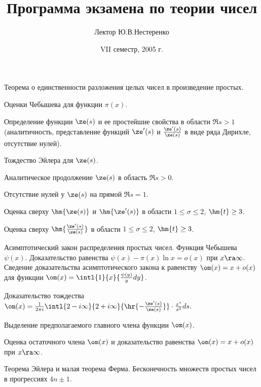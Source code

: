 \documentclass[a4paper]{article}
\title{Программа экзамена по теории чисел}
\author{Лектор Ю.В.Нестеренко}
\date{VII семестр, 2005 г.}
\begin{document}
\maketitle

\begin{nums}{-3.2}

\item  Теорема о единственности разложения целых чисел в произведение простых.

\item  Оценки Чебышева для функции $\pi(x)$.

\item  Определение функции $\ze(s)$
и ее простейшие свойства в области $\Re s > 1$ (аналитичность, представление функций
$\ze'(s)$ и $\frac{\ze '(s)}{\ze(s)}$ в виде ряда Дирихле,
отсутствие нулей).

\item  Тождество Эйлера для $\ze(s)$.

\item  Аналитическое продолжение $\ze(s)$ в область $\Re s > 0$.

\item  Отсутствие нулей у $\ze(s)$ на прямой $\Re s = 1$.

\item  Оценка сверху $\hm{\ze(s)}$ и $\hm{\ze'(s)}$
в области $1\le \sigma \le 2$, $\hm{t} \ge 3$.

\item  Оценка сверху $\hm{\frac{\ze '(s)}{\ze (s)}}$ в области $1 \le \sigma \le 2$,
$\hm{t} \ge 3$.

\item  Асимптотический закон распределения простых чисел. Функция Чебышева~$\psi(x)$.
Доказательство равенства $\psi(x) - \pi(x)\ln x = o(x)$ при $x \ra\infty$.
Сведение доказательства асимптотического закона к равенству
$\om(x) = x + o(x)$ для функции $\om (x) = \intl{1}{x}{\frac{\psi(y)}{y}dy}$.

\item  Доказательство тождества
$
\om (x) = \frac{1}{2\pi i}\intl{2 - i\infty }{2 + i\infty }{\hr{-\frac{\ze '(s)}{\ze (s)}}} \cdot \frac{x^s}{s^2}ds.
$

\item Выделение предполагаемого главного члена функции $\om(x)$.

\item Оценка остаточного члена $\om(x)$ и доказательство равенства $\om (x) = x + o(x)$ при $x \ra \infty$.

\item  Теорема Эйлера и малая теорема Ферма. Бесконечность множеств простых чисел в прогрессиях $4n\pm 1$.


\end{nums}
\end{document}
